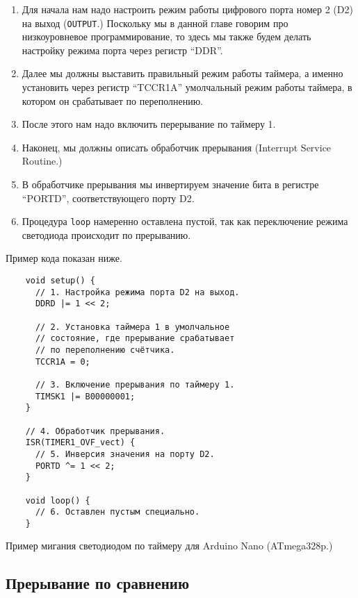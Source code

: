 \documentclass[../sparc.tex]{subfiles}
\begin{document}
\begin{enumerate}
\item Для начала нам надо настроить режим работы цифрового порта номер 2 (D2) на
  выход (\texttt{OUTPUT}.)  Поскольку мы в данной главе говорим про
  низкоуровневое программирование, то здесь мы также будем делать настройку
  режима порта через регистр ``DDR''.
\item Далее мы должны выставить правильный режим работы таймера, а именно
  установить через регистр ``TCCR1A'' умолчальный режим работы таймера, в
  котором он срабатывает по переполнению.
\item После этого нам надо включить перерывание по таймеру 1.
\item Наконец, мы должны описать обработчик прерывания (Interrupt Service
  Routine.)
\item В обработчике прерывания мы инвертируем значение бита в регистре
  ``PORTD'', соответствующего порту D2.
\item Процедура \texttt{loop} намеренно оставлена пустой, так как
  переключение режима светодиода происходит по прерыванию.
\end{enumerate}

Пример кода показан ниже.

\begin{listing}[H]
  \begin{verbatim}
    void setup() {
      // 1. Настройка режима порта D2 на выход.
      DDRD |= 1 << 2;

      // 2. Установка таймера 1 в умолчальное
      // состояние, где прерывание срабатывает
      // по переполнению счётчика.
      TCCR1A = 0;

      // 3. Включение прерывания по таймеру 1.
      TIMSK1 |= B00000001;
    }

    // 4. Обработчик прерывания.
    ISR(TIMER1_OVF_vect) {
      // 5. Инверсия значения на порту D2.
      PORTD ^= 1 << 2;
    }

    void loop() {
      // 6. Оставлен пустым специально.
    }
  \end{verbatim}
  \caption{Пример мигания светодиодом по таймеру для Arduino Nano (ATmega328p.)}
  \label{listing:mcu-timer-example-1}
\end{listing}

\subsection{Прерывание по сравнению}
\end{document}
